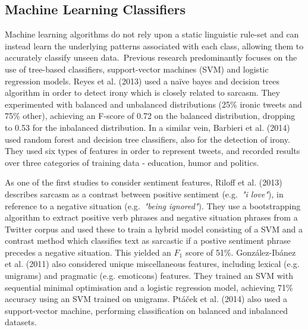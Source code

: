 \documentclass[12pt,a4paper]{article}
\begin{document}
\subsection{Machine Learning Classifiers}\vspace{-10pt}
\noindent Machine learning algorithms do not rely upon a static linguistic rule-set and can instead learn the underlying patterns associated with each class, allowing them to accurately classify unseen data.\ Previous research predominantly focuses on the use of tree-based classifiers, support-vector machines (SVM) and logistic regression models. Reyes et al. (2013) \cite{reyes2013multidimensional} used a na\"{i}ve bayes and decision trees algorithm in order to detect irony which is closely related to sarcasm. They experimented with balanced and unbalanced distributions (25\% ironic tweets and 75\% other), achieving an F-score of 0.72 on the balanced distribution, dropping to 0.53 for the inbalanced distribution. In a similar vein, Barbieri et al. (2014) \cite{barbieri2014modelling} used random forest and decision tree classifiers, also for the detection of irony. They used six types of features in order to represent tweets, and recorded results over three categories of training data - education, humor and politics.



As one of the first studies to consider sentiment features, Riloff et al. (2013) \cite{riloff2013sarcasm} describes sarcasm as a contrast between positive sentiment (e.g.\ \textit{"i love"}), in reference to a negative situation (e.g.\ \textit{"being ignored"}). They use a bootstrapping algorithm to extract positive verb phrases and negative situation phrases from a Twitter corpus and used these to train a hybrid model consisting of a SVM and a contrast method which classifies text as sarcastic if a postive sentiment phrase precedes a negative situation. This yielded an $F_1$ score of 51\%. Gonz{\'a}lez-Ib{\'a}nez et al. (2011) \cite{gonzalez2011identifying} also considered unique miscellaneous features, including lexical (e.g. unigrams) and pragmatic (e.g. emoticons) features. They trained an SVM with sequential minimal optimisation and a logistic regression model, achieving 71\% accuracy using an SVM trained on unigrams. Pt{\'a}{\v{c}ek et al. (2014)} \cite{ptavcek2014sarcasm} also used a support-vector machine, performing classification on balanced and inbalanced datasets.
\end{document}
